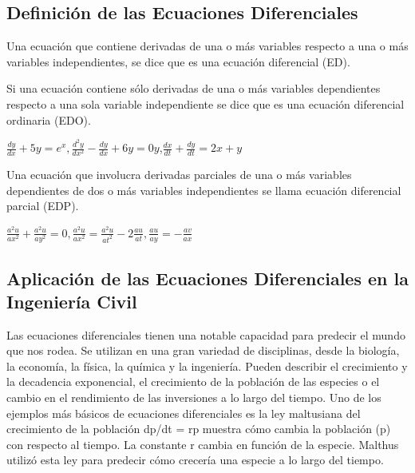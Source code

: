 \documentclass{article}
\begin{document}
\subsection{Definición de las Ecuaciones Diferenciales}
\large Una ecuación que contiene derivadas de una o más variables respecto a una o
más variables independientes, se dice que es una ecuación diferencial (ED).\newline


Si una ecuación contiene sólo derivadas de una o más variables dependientes respecto a una sola variable independiente se dice que es una ecuación diferencial ordinaria (EDO).\newline

\begin{center}
\Large$\frac{dy}{dx} + 5y = e^{x}, $\hspace{1cm}$\frac{d^{2}y}{dx^{2}} - \frac{dy}{dx} + 6y = 0 y$,\hspace{1cm}$ \frac{dx}{dt} + \frac{dy}{dt} = 2x + y $\newline
\end{center}
 
\large Una ecuación que involucra derivadas parciales de una o más variables dependientes de dos o más variables independientes
se llama ecuación diferencial parcial (EDP).\newline

\begin{center}
\Large$\frac{ a^{2}u}{ ax^{2}} + \frac{ a^{2}u}{ ay^{2}} = 0,$\hspace{1cm}$\frac{ a^{2}u}{ ax^{2}} = \frac{ a^{2}u}{ at^{2}} - 2\frac{ au}{ at},$\hspace{1cm}$\frac{au}{ay} = - \frac{av}{ax}$\newline
\end{center}

\subsection{Aplicación de las Ecuaciones Diferenciales en la Ingeniería Civil}
\large Las ecuaciones diferenciales tienen una notable capacidad para predecir el mundo que nos rodea.    Se utilizan en una gran variedad de disciplinas, desde la biología, la economía, la física, la química y la ingeniería. Pueden describir el crecimiento y la decadencia exponencial, el crecimiento de la población de las especies o el cambio en el rendimiento de las inversiones a lo largo del tiempo.\newline
Uno de los ejemplos más básicos de ecuaciones diferenciales es la ley maltusiana del crecimiento de la población dp/dt = rp muestra cómo cambia la población (p) con respecto al tiempo.    La constante r cambia en función de la especie.    Malthus utilizó esta ley para predecir cómo crecería una especie a lo largo del tiempo.
\end{document}
